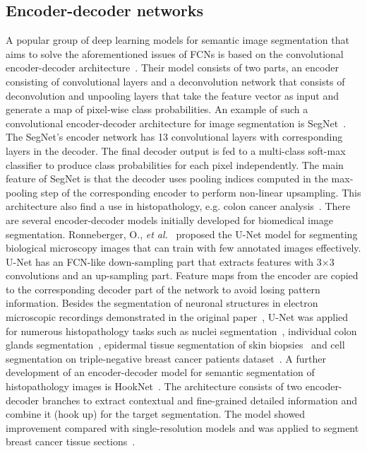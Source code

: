 \subsection{Encoder-decoder networks}
A popular group of deep learning models for semantic image segmentation that aims to solve the
aforementioned issues of FCNs is based on the convolutional encoder-decoder architecture~\cite{noh2015learning}.
Their model consists of two parts, an encoder consisting of convolutional layers and a deconvolution
network that consists of deconvolution and unpooling layers that take the feature vector as input
and generate a map of pixel-wise class probabilities. An example of such a convolutional encoder-decoder
architecture for image segmentation is SegNet~\cite{badrinarayanan2017segnet}. The SegNet's encoder
network has 13 convolutional layers with corresponding layers in the decoder. The final decoder output
is fed to a multi-class soft-max classifier to produce class probabilities for each pixel independently.
The main feature of SegNet is that the decoder uses pooling indices computed in the max-pooling step
of the corresponding encoder to perform non-linear upsampling. This architecture also find a use in
histopathology, e.g. colon cancer analysis~\cite{hamida2021deep}. There are several encoder-decoder models
initially developed for biomedical image segmentation. Ronneberger, O., \textit{et al.}~\cite{10.1007/978-3-319-24574-4_28}
proposed the U-Net model for segmenting biological microscopy images that can train with few annotated
images effectively. U-Net has an FCN-like down-sampling part that extracts features with 3$\times$3
convolutions and an up-sampling part. Feature maps from the encoder are copied to the corresponding
decoder part of the network to avoid losing pattern information. Besides the segmentation of neuronal
structures in electron microscopic recordings demonstrated in the original paper~\cite{10.1007/978-3-319-24574-4_28},
U-Net was applied for numerous histopathology tasks such as nuclei segmentation~\cite{lagree2021review, zeng2019ric},
individual colon glands segmentation~\cite{pinckaers2019neural}, epidermal tissue segmentation of skin biopsies~\cite{oskal2019u}
and cell segmentation on triple-negative breast cancer patients dataset~\cite{bagdigen2020cell}.
A further development of an encoder-decoder model for semantic segmentation of histopathology images
is HookNet~\cite{van2021hooknet}. The architecture consists of two encoder-decoder branches to extract
contextual and fine-grained detailed information and combine it (hook up) for the target segmentation.
The model showed improvement compared with single-resolution models and was applied to segment
breast cancer tissue sections~\cite{van2021hooknet}.

